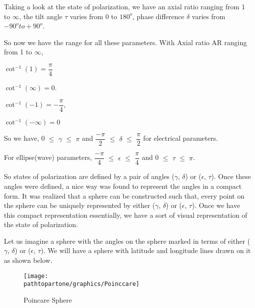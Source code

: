 Taking a look at the state of polarization, we have an axial ratio ranging from 1 to $\infty$, the tilt angle $\tau$ varies from 0 to $180^{o}$, phase difference $\delta$ varies from $-90^{o} to +90^{o}$.

So now we have the range for all these parameters. With Axial ratio AR ranging from 1 to $\infty$, 

$\cot^{-1}(1)= \dfrac{\pi}{4}$

$\cot^{-1}(\infty)= 0$.

$\cot^{-1}(-1) = -\dfrac{\pi}{4}$, 

$\cot^{-1}(-\infty) = 0$

So we have,  0 $\leq$ $\gamma$ $\leq$ $\pi$  and $\dfrac{-\pi}{2}$ $\leq$ $\delta$ $\leq$ $\dfrac{\pi}{2}$ for electrical parameters.

For ellipse(wave) parameters, $\dfrac{-\pi}{4}$ $\leq$ $\epsilon$ $\leq$ $\dfrac{\pi}{4}$ and 0 $\leq$ $\tau$ $\leq$ $\pi$.

So states of polarization are defined by a pair of angles ($\gamma$, $\delta$) or ($\epsilon$, $\tau$). Once these angles were defined, a nice way was found to represent the angles in a compact form. It was realized that a sphere can be constructed such that, every point on the sphere can be uniquely represented by either ($\gamma$, $\delta$) or ($\epsilon$, $\tau$). Once we have this compact representation essentially, we have a sort of visual representation of the state of polarization. 

Let us imagine a sphere with the angles on the sphere marked in terms of either ($\gamma$, $\delta$) or ($\epsilon$, $\tau$). We will have a sphere with latitude and longitude lines drawn on it as shown below.
\begin{figure}[h]
\centering
\texttt{[image: \\pathtopartone/graphics/Poinccare]}
\caption{Poincare Sphere}
\label{fig:poinccare}
\end{figure}

